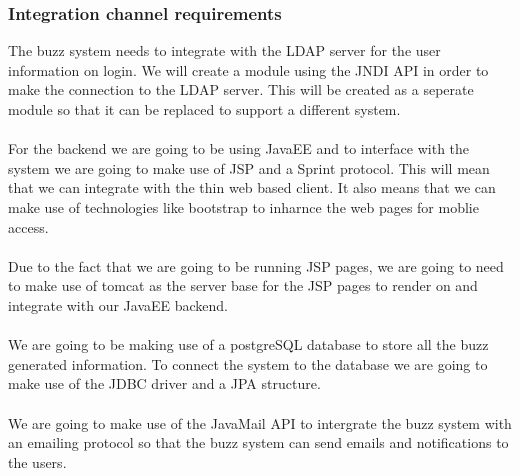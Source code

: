 \subsubsection{Integration channel requirements}
The buzz system needs to integrate with the LDAP server for the user information on login. We will create a module using the JNDI API in order to make the connection to the LDAP server. This will be created as a seperate module so that it can be replaced to support a different system.\\
\\
For the backend we are going to be using JavaEE and to interface with the system we are going to make use of JSP and a Sprint protocol. This will mean that we can integrate with the thin web based client. It also means that we can make use of technologies like bootstrap to inharnce the web pages for moblie access.\\
\\
Due to the fact that we are going to be running JSP pages, we are going to need to make use of tomcat as the server base for the JSP pages to render on and integrate with our JavaEE backend.\\
\\
We are going to be making use of a postgreSQL database to store all the buzz generated information. To connect the system to the database we are going to make use of the JDBC driver and a JPA structure.\\
\\
We are going to make use of the JavaMail API to intergrate the buzz system with an emailing protocol so that the buzz system can send emails and notifications to the users.\\